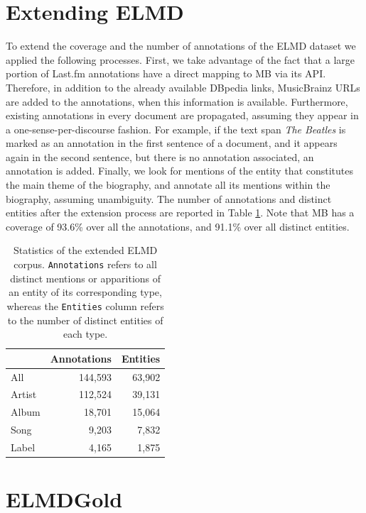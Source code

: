 \section{Extending ELMD}
\label{sec:linking:extending}

To extend the coverage and the number of annotations of the \textsc{ELMD} dataset we applied the following processes. First, we take advantage of the fact that a large portion of Last.fm annotations have a direct mapping to MB via its API. Therefore, in addition to the already available DBpedia links, MusicBrainz URLs are added to the annotations, when this information is available. Furthermore, existing annotations in every document are propagated, assuming they appear in a one-sense-per-discourse fashion. For example, if the text span \textit{The Beatles} is marked as an annotation in the first sentence of a document, and it appears again in the second sentence, but there is no annotation associated, an annotation is added. Finally, we look for mentions of the entity that constitutes the main theme of the biography, and annotate all its mentions within the biography, assuming unambiguity. The number of annotations and distinct entities after the extension process are reported in Table \ref{tbl:linking:elmd2}. Note that MB has a coverage of 93.6\% over all the annotations, and 91.1\% over all distinct entities.

\begin{table}[]
\centering
\begin{tabular}{| l| r |r |}
\hline
& \textbf{Annotations} & \textbf{Entities} \\ \hline
All    & 144,593      & 63,902    \\ \hline
Artist & 112,524      & 39,131    \\ \hline
Album  & 18,701       & 15,064    \\ \hline
Song  & 9,203        & 7,832     \\ \hline
Label  & 4,165        & 1,875    
\\ \hline
\end{tabular}
\caption{Statistics of the extended ELMD corpus. \texttt{Annotations} refers to all distinct mentions or apparitions of an entity of its corresponding type, whereas the \texttt{Entities} column refers to the number of distinct entities of each type.}
\label{tbl:linking:elmd2}
\end{table}


\section{ELMDGold}
\label{sec:linking:gold}

